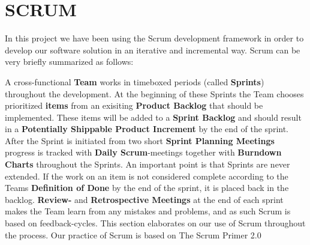 \section{SCRUM}

In this project we have been using the Scrum development framework in order to develop our software solution in an iterative and incremental way. Scrum can be very briefly summarized as follows:

A cross-functional \textbf{Team} works in timeboxed periods (called \textbf{Sprints}) throughout the development. At the beginning of these Sprints the Team chooses prioritized \textbf{items} from an exisiting \textbf{Product Backlog} that should be implemented. These items will be added to a \textbf{Sprint Backlog} and should result in a \textbf{ Potentially Shippable Product Increment} by the end of the sprint.
After the Sprint is initiated from two short \textbf{Sprint Planning Meetings} progress is tracked with \textbf{Daily Scrum}-meetings together with \textbf{Burndown Charts} throughout the Sprints. An important point is that Sprints are never extended. If the work on an item is not considered complete according to the Teams \textbf{Definition of Done} by the end of the sprint, it is placed back in the backlog.
\textbf{Review-} and \textbf{Retrospective Meetings} at the end of each sprint makes the Team learn from any mistakes and problems, and as such Scrum is based on feedback-cycles.
This section elaborates on our use of Scrum throughout the process. Our practice of Scrum is based on The Scrum Primer 2.0 \cite{ScrumPrimer2}







